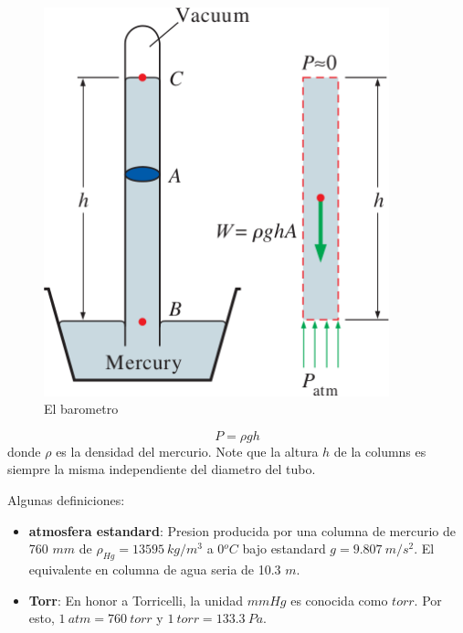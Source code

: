 \documentclass[10pt, oneside]{article}
\begin{document}
\begin{figure}[h]
\centering
\includegraphics[width=10cm]{baro1}
\caption{El barometro}
\label{baro1}
\end{figure}


\begin{equation}
P = \rho g h
\label{bb1}
\end{equation}
donde $\rho$ es la densidad del mercurio. Note que la altura $h$ de la columns es siempre la misma independiente del diametro del tubo. 

Algunas definiciones:
\begin{itemize}
\item \textbf{atmosfera estandard}: Presion producida por una columna de mercurio de 760 $mm$ de $\rho_{Hg} = 13595\ kg/m^3$ a 0$^oC$ bajo estandard $g=9.807\ m/s^2$. El equivalente en columna de agua seria de 10.3 $m$.
\item \textbf{Torr}: En honor a Torricelli, la unidad $mmHg$ es conocida como $torr$. Por esto, $1\ atm = 760\ torr$ y $1\ torr = 133.3\ Pa$. 
\end{itemize}
\end{document}
